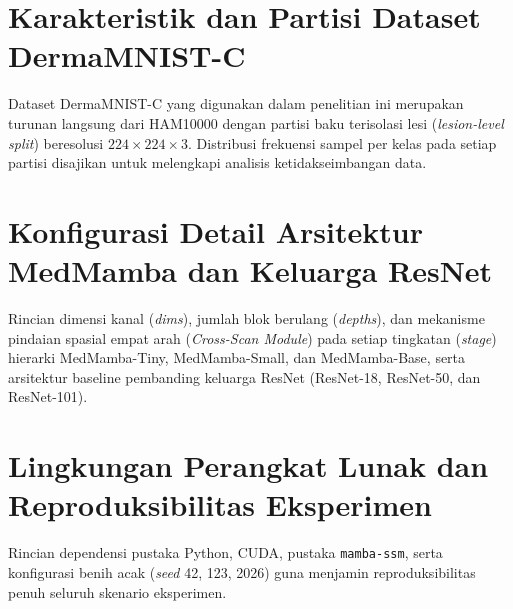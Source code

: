 \section{Karakteristik dan Partisi Dataset DermaMNIST-C} \label{app:dataset}
Dataset DermaMNIST-C \cite{abhishek2025investigating} yang digunakan dalam penelitian ini merupakan turunan langsung dari HAM10000 dengan partisi baku terisolasi lesi (\textit{lesion-level split}) beresolusi $224 \times 224 \times 3$. Distribusi frekuensi sampel per kelas pada setiap partisi disajikan untuk melengkapi analisis ketidakseimbangan data.

\section{Konfigurasi Detail Arsitektur MedMamba dan Keluarga ResNet} \label{app:arsitektur}
Rincian dimensi kanal (\textit{dims}), jumlah blok berulang (\textit{depths}), dan mekanisme pindaian spasial empat arah (\textit{Cross-Scan Module}) pada setiap tingkatan (\textit{stage}) hierarki MedMamba-Tiny, MedMamba-Small, dan MedMamba-Base, serta arsitektur baseline pembanding keluarga ResNet (ResNet-18, ResNet-50, dan ResNet-101).

\section{Lingkungan Perangkat Lunak dan Reproduksibilitas Eksperimen} \label{app:reproducibility}
Rincian dependensi pustaka Python, CUDA, pustaka \texttt{mamba-ssm}, serta konfigurasi benih acak (\textit{seed} 42, 123, 2026) guna menjamin reproduksibilitas penuh seluruh skenario eksperimen.
